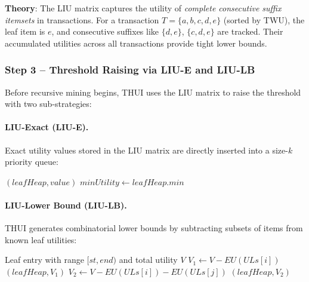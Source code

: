 \textbf{Theory}: The LIU matrix captures the utility of \textit{complete consecutive suffix itemsets} in transactions. For a transaction $T = \{a, b, c, d, e\}$ (sorted by TWU), the leaf item is $e$, and consecutive suffixes like $\{d,e\}$, $\{c,d,e\}$ are tracked. Their accumulated utilities across all transactions provide tight lower bounds.

\subsubsection{Step 3 -- Threshold Raising via LIU-E and LIU-LB}

Before recursive mining begins, THUI uses the LIU matrix to raise the threshold with two sub-strategies:

\paragraph{LIU-Exact (LIU-E).}
Exact utility values stored in the LIU matrix are directly inserted into a size-$k$ priority queue:

\begin{algorithm}[H]
\caption{LIU-Exact Threshold Raising (Ref: \texttt{thui/thui.go}, \texttt{raisingThresholdLeaf}, lines 686--692)}
\label{alg:liue}
\begin{algorithmic}[1]
        \State {}$(leafHeap, value)$ 
    \EndIf
\EndFor
{}
    \State $minUtility \leftarrow leafHeap.min$
\EndIf
\end{algorithmic}
\end{algorithm}

\paragraph{LIU-Lower Bound (LIU-LB).}
THUI generates combinatorial lower bounds by subtracting subsets of items from known leaf utilities:

\begin{algorithm}[H]
\caption{LIU-LB Threshold Raising (Ref: \texttt{thui/thui.go}, \texttt{raisingThresholdLeaf}, lines 694--721)}
\label{alg:liulb}
\begin{algorithmic}[1]
\Require Leaf entry with range $[st, end)$ and total utility $V$
 
    \State $V_1 \leftarrow V - EU(ULs[i])$
        \State {}$(leafHeap, V_1)$
    \EndIf
     
        \State $V_2 \leftarrow V - EU(ULs[i]) - EU(ULs[j])$
            \State {}$(leafHeap, V_2)$
        \EndIf
    \EndFor
\EndFor
\end{algorithmic}
\end{algorithm}

